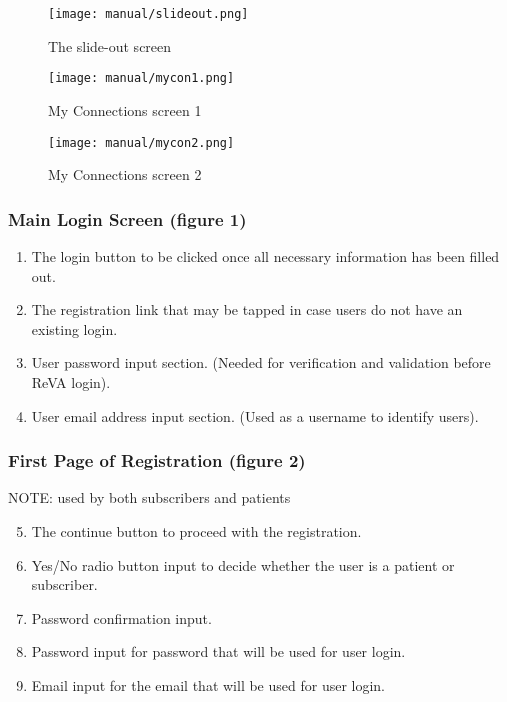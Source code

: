 \documentclass{article}
\begin{document}
\begin{figure}[h!]
\centering
\begin{minipage}{.5\textwidth}
  \centering
  \texttt{[image: manual/slideout.png]}
  \caption{\label{fig:slideout}The slide-out screen}
\end{minipage}%
\begin{minipage}{.5\textwidth}
  \centering
  \texttt{[image: manual/mycon1.png]}
  \caption{\label{fig:mycon1}My Connections screen 1}
\end{minipage}
\end{figure}

\begin{figure}[h!]
\centering
\begin{minipage}{.5\textwidth}
  \centering
  \texttt{[image: manual/mycon2.png]}
  \caption{\label{fig:mycon2}My Connections screen 2}
\end{minipage}%
\end{figure}


\clearpage
\pagebreak
\subsubsection{Main Login Screen (figure 1)}
\begin{enumerate}
   	\item The login button to be clicked once all necessary information has been filled out. 
   	\item The registration link that may be tapped in case users do not have an existing login. 
 	\item User password input section. (Needed for verification and validation before ReVA login). 
	\item User email address input section. (Used as a username to identify users). 
\end{enumerate}
\subsubsection{First Page of Registration (figure 2)}
NOTE: used by both subscribers and patients
\begin{enumerate}
\setcounter{enumi}{4}
	\item The continue button to proceed with the registration. 
	\item Yes/No radio button input to decide whether the user is a patient or subscriber. 
	\item Password confirmation input. 
	\item Password input for password that will be used for user login. 
	\item Email input for the email that will be used for user login. 
\end{enumerate}
\end{document}
